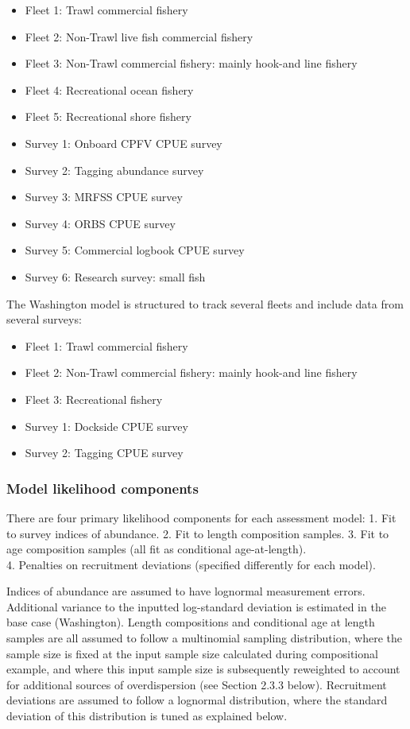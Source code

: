 \documentclass[11pt,
  english,
  letterpaper,
]{article}
\providecommand{\tightlist}{%
  \setlength{\itemsep}{0pt}\setlength{\parskip}{0pt}}
\providecommand{\tightlist}{%
  \setlength{\itemsep}{0pt}\setlength{\parskip}{0pt}}
\begin{document}
\begin{itemize}
\tightlist
\item
  Fleet 1: Trawl commercial fishery
\item
  Fleet 2: Non-Trawl live fish commercial fishery
\item
  Fleet 3: Non-Trawl commercial fishery: mainly hook-and line fishery
\item
  Fleet 4: Recreational ocean fishery
\item
  Fleet 5: Recreational shore fishery
\item
  Survey 1: Onboard CPFV CPUE survey
\item
  Survey 2: Tagging abundance survey
\item
  Survey 3: MRFSS CPUE survey
\item
  Survey 4: ORBS CPUE survey
\item
  Survey 5: Commercial logbook CPUE survey
\item
  Survey 6: Research survey: small fish
\end{itemize}

The Washington model is structured to track several fleets and include data from several surveys:

\begin{itemize}
\tightlist
\item
  Fleet 1: Trawl commercial fishery
\item
  Fleet 2: Non-Trawl commercial fishery: mainly hook-and line fishery
\item
  Fleet 3: Recreational fishery
\item
  Survey 1: Dockside CPUE survey
\item
  Survey 2: Tagging CPUE survey
\end{itemize}

\hypertarget{model-likelihood-components}{%
\subsubsection{Model likelihood components}\label{model-likelihood-components}}

There are four primary likelihood components for each assessment model: 1. Fit to survey indices of abundance. 2. Fit to length composition samples. 3. Fit to age composition samples (all fit as conditional age-at-length).\\
4. Penalties on recruitment deviations (specified differently for each model).

Indices of abundance are assumed to have lognormal measurement errors. Additional variance to the inputted log-standard deviation is estimated in the base case (Washington). Length compositions and conditional age at length samples are all assumed to follow a multinomial sampling distribution, where the sample size is fixed at the input sample size calculated during compositional example, and where this input sample size is subsequently reweighted to account for additional sources of overdispersion (see Section 2.3.3 below). Recruitment deviations are assumed to follow a lognormal distribution, where the standard deviation of this distribution is tuned as explained below.
\end{document}
